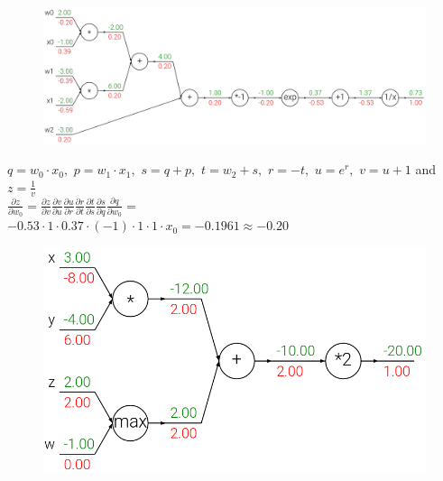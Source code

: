 \documentclass[10pt, compress]{beamer}
\begin{document}
\begin{frame}
  \vspace{1cm}
  \begin{figure}
    \includegraphics[width=1\linewidth]{imgs/backprop_2}
  \end{figure}
  $q = w_0 \cdot x_0,$ \quad $p = w_1 \cdot x_1,$ \quad $s = q + p,$ \quad $t = w_2 + s,$ \quad $r = -t,$ \quad $u = e^r,$ \quad $v = u + 1$ and $z = \frac{1}{v}$ \\
  \Large{$\frac{\partial z}{\partial w_0} = \frac{\partial z}{\partial v}\frac{\partial v}{\partial u}\frac{\partial u}{\partial r}\frac{\partial r}{\partial t}\frac{\partial t}{\partial s}\frac{\partial s}{\partial q}\frac{\partial q}{\partial w_0} = $} \\
  \small{$-0.53 \cdot 1 \cdot 0.37 \cdot (-1) \cdot 1 \cdot 1 \cdot  x_0 = -0.1961 \approx -0.20$}
\end{frame}

\begin{frame}
  \vspace{1cm}
  \begin{figure}
    \includegraphics[width=1\linewidth]{imgs/backprop_3}
  \end{figure}
\end{frame}
\end{document}
